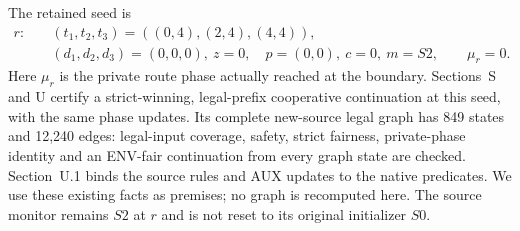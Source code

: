 The retained seed is
\[
\begin{aligned}
 r:\quad &(t_1,t_2,t_3)=((0,4),(2,4),(4,4)),\\
 & (d_1,d_2,d_3)=(0,0,0),\ z=0,\quad
 p=(0,0),\ c=0,\ m=S2,\qquad \mu_r=0 .
\end{aligned}
\]
Here $\mu_r$ is the private route phase actually reached at the boundary.
Sections~S and U certify a strict-winning, legal-prefix cooperative
continuation at this seed, with the same phase updates.
Its complete new-source legal graph has 849 states and 12,240 edges:
legal-input coverage, safety, strict fairness, private-phase identity and
an ENV-fair continuation from every graph state are checked.
Section~U.1 binds the source rules and AUX updates to the native predicates.
We use these existing facts as premises; no graph is recomputed here.
The source monitor remains $S2$ at $r$ and is not reset to its original
initializer $S0$.

